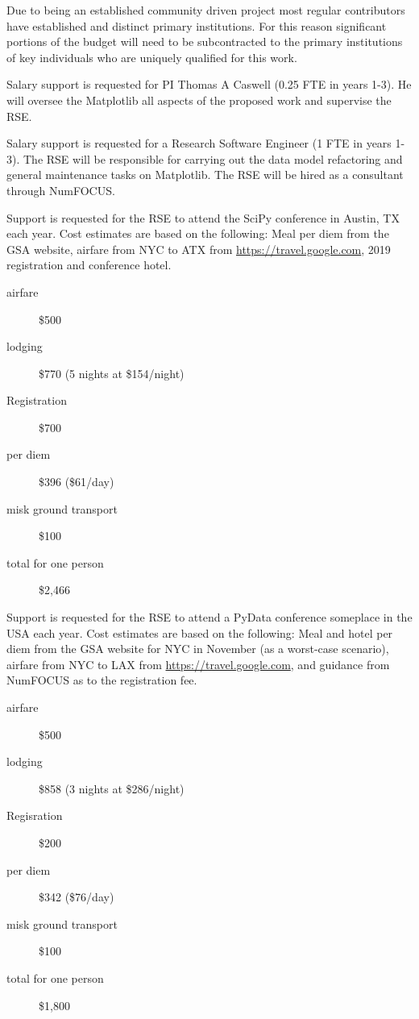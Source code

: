 \documentclass[12pt]{article}
\numberwithin{page}{section}
\begin{document}
Due to being an established community driven project most regular
contributors have established and distinct primary institutions.  For
this reason significant portions of the budget will need to be
subcontracted to the primary institutions of key individuals who are
uniquely qualified for this work.

Salary support is requested for PI Thomas A Caswell (0.25 FTE in years
1-3).  He will oversee the Matplotlib all aspects of the proposed work
and supervise the RSE.

Salary support is requested for a Research Software Engineer (1 FTE in
years 1-3).  The RSE will be responsible for carrying out the data
model refactoring and general maintenance tasks on Matplotlib.  The
RSE will be hired as a consultant through NumFOCUS.

Support is requested for the RSE to attend the SciPy conference in
Austin, TX each year.  Cost estimates are based on the following: Meal
per diem from the GSA website, airfare from NYC to ATX from
\url{https://travel.google.com}, 2019 registration and conference hotel.

\begin{description}
\item[airfare] \$500
\item [lodging] \$770 (5 nights at \$154/night)
\item [Registration] \$700
\item [per diem] \$396 (\$61/day)
\item [misk ground transport] \$100
\item [total for one person] \$2,466
\end{description}

Support is requested for the RSE to attend a PyData conference
someplace in the USA each year.  Cost estimates are based on the
following: Meal and hotel per diem from the GSA website for NYC in
November (as a worst-case scenario), airfare from NYC to LAX from
\url{https://travel.google.com}, and guidance from NumFOCUS as to the
registration fee.


\begin{description}
\item [airfare] \$500
\item [lodging] \$858 (3 nights at \$286/night)
\item [Regisration] \$200
\item [per diem] \$342 (\$76/day)
\item [misk ground transport] \$100
\item [total for one person] \$1,800
\end{description}
\end{document}
